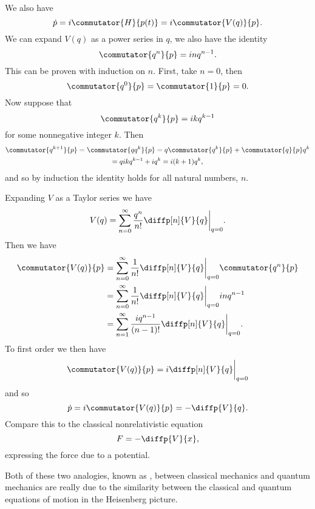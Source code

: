 \documentclass[fleqn]{NotesClass}
\newcommand{\ident}{1}
\begin{document}
\begin{exm}{}{}
        We also have
        \begin{equation}
            \dot{p} = i\commutator{H}{p(t)} = i\commutator{V(q)}{p}.
        \end{equation}
        We can expand \(V(q)\) as a power series in \(q\), we also have the identity
        \begin{equation}
            \commutator{q^n}{p} = inq^{n-1}.
        \end{equation}
        This can be proven with induction on \(n\).
        First, take \(n = 0\), then
        \begin{equation}
            \commutator{q^0}{p} = \commutator{\ident}{p} = 0.
        \end{equation}
        Now suppose that
        \begin{equation}
            \commutator{q^k}{p} = ikq^{k-1}
        \end{equation}
        for some nonnegative integer \(k\).
        Then
        \begin{multline}
            \commutator{q^{k+1}}{p} = \commutator{qq^k}{p} = q\commutator{q^k}{p} + \commutator{q}{p}q^k\\
            = q ikq^{k-1} + iq^k = i(k + 1)q^k,
        \end{multline}
        and so by induction the identity holds for all natural numbers, \(n\).
        
        Expanding \(V\) as a Taylor series we have
        \begin{equation}
            V(q) = \sum_{n = 0}^{\infty} \frac{q^n}{n!} \diffp[n]{V}{q}\bigg|_{q = 0}.
        \end{equation}
        Then we have
        \begin{align}
            \commutator{V(q)}{p} &= \sum_{n = 0}^{\infty} \frac{1}{n!} \diffp[n]{V}{q}\bigg|_{q = 0} \commutator{q^n}{p}\\
            &= \sum_{n = 0}^{\infty} \frac{1}{n!} \diffp[n]{V}{q}\bigg|_{q = 0} in q^{n - 1}\\
            &= \sum_{n = 1}^{\infty} \frac{iq^{n - 1}}{(n - 1)!} \diffp[n]{V}{q}\bigg|_{q = 0}.
        \end{align}
        To first order we then have
        \begin{equation}
            \commutator{V(q)}{p} = i \diffp[n]{V}{q}\bigg|_{q = 0}
        \end{equation}
        and so
        \begin{equation}
            \dot{p} = i\commutator{V(q)}{p} = -\diffp{V}{q}.
        \end{equation}
        Compare this to the classical nonrelativistic equation
        \begin{equation}
            F = -\diffp{V}{x},
        \end{equation}
        expressing the force due to a potential.
        
        Both of these two analogies, known as , between classical mechanics and quantum mechanics are really due to the similarity between the classical and quantum equations of motion in the Heisenberg picture.
    \end{exm}
    
\end{document}
